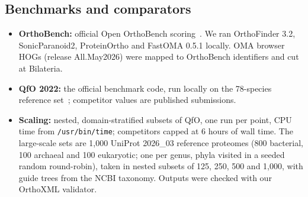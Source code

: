 \subsection*{Benchmarks and comparators}
\begin{itemize}
\item \textbf{OrthoBench:} official Open OrthoBench scoring~\cite{emms2020orthobench}. We ran OrthoFinder 3.2, SonicParanoid2, ProteinOrtho and FastOMA 0.5.1 locally. OMA browser HOGs (release All.May2026) were mapped to OrthoBench identifiers and cut at Bilateria.
\item \textbf{QfO 2022:} the official benchmark code, run locally on the 78-species reference set~\cite{altenhoff2024qfo}; competitor values are published submissions.
\item \textbf{Scaling:} nested, domain-stratified subsets of QfO, one run per point, CPU time from \texttt{/usr/bin/time}; competitors capped at 6 hours of wall time. The large-scale sets are 1,000 UniProt 2026\_03 reference proteomes (800 bacterial, 100 archaeal and 100 eukaryotic; one per genus, phyla visited in a seeded random round-robin), taken in nested subsets of 125, 250, 500 and 1,000, with guide trees from the NCBI taxonomy. Outputs were checked with our OrthoXML validator.
\end{itemize}

